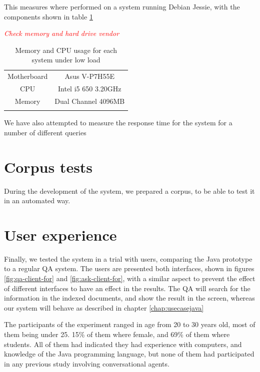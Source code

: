 This measures where performed on a system running Debian Jessie, with the components shown in table \ref{tab:systeminfo}

\emph{\textcolor{red}{Check memory and hard drive vendor}}
\begin{center}
  \centering
  \begin{table}
    \begin{tabular*}{0.7\textwidth}{| c | c |}
      \hhline{|-|-|}
      Motherboard & Asus V-P7H55E \\ \hhline{|-|-|} 
      CPU & Intel i5 650 3.20GHz  \\ \hhline{|-|-|} 
      Memory & Dual Channel 4096MB  \\ \hhline{|-|-|} 
      \end{tabular*}
    \caption{Memory and CPU usage for each system under low load}
    \label{tab:systeminfo}
  \end{table}
\end{center}

We have also attempted to measure the response time for the system for a number of different queries

\section{Corpus tests}

During the development of the system, we prepared a corpus, to be able to test it in an automated way.

\section{User experience}

Finally, we tested the system in a trial with users, comparing the Java prototype to a regular \ac{QA} system. The users are presented both interfaces, shown in figures \ref{fig:qa-client-for} and \ref{fig:ask-client-for}, with a similar aspect to prevent the effect of different interfaces to have an effect in the results. The \ac{QA} will search for the information in the indexed documents, and show the result in the screen, whereas our system will behave as described in chapter \ref{chap:usecasejava}

The participants of the experiment ranged in age from 20 to 30 years old, most of them being under 25. 15\% of them where female, and 69\% of them where students. All of them had indicated they had experience with computers, and knowledge of the Java programming language, but none of them had participated in any previous study involving conversational agents.

